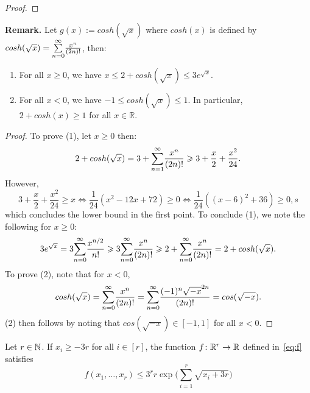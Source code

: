 \begin{proof}
\end{proof}
\textbf{Remark.} Let $g(x):= cosh(\sqrt{x})$ where $cosh(x)$ is defined by $cosh(\sqrt{x})=\overunderset{\infty}{n=0}{\sum}\frac{x^n}{(2n)!}$, then: 
\begin{enumerate}
\item For all $x\geq 0$, we have $x \leq 2+cosh(\sqrt{x}) \leq 3e^{\sqrt{x}}$.
\item For all $x <0$, we have $-1 \leq cosh(\sqrt{x})\leq 1$. In particular, $2+cosh(x)\geq 1$ for all $x\in \mathbb{R}$.
\end{enumerate}
\begin{proof} To prove (1), let $x\geq 0$ then:
\begin{equation*}
  2+cosh(\sqrt{x}) = 3 + \overunderset{\infty}{n=1}{\sum}\frac{x^n}{(2n)!}\geq 3 + \frac{x}{2}+\frac{x^2}{24}.
\end{equation*}
However, \begin{equation*}
  3+\frac{x}{2}+\frac{x^2}{24}\geq x \iff \frac{1}{24}(x^2-12x+72)\geq 0 \iff \frac{1}{24}((x-6)^2+36)\geq 0,s
\end{equation*}
which concludes the lower bound in the first point. To conclude (1), we note the following for $x\geq0$: 
\begin{equation*}
3e^{\sqrt{x}}= 3\overunderset{\infty}{n=0}{\sum}\frac{x^{n/2}}{n!}\geq 3\overunderset{\infty}{n=0}{\sum}\frac{x^{n}}{(2n)!} \geq 2 + \overunderset{\infty}{n=0}{\sum}\frac{x^{n}}{(2n)!}= 2 + cosh(\sqrt{x}).
\end{equation*}
To prove (2), note that for $x<0$,
\begin{equation*}
cosh(\sqrt{x})= \overunderset{\infty}{n=0}{\sum}\frac{x^n}{(2n)!}= \overunderset{\infty}{n=0}{\sum}\frac{(-1)^n \sqrt{-x}^{2n}}{(2n)!}= cos(\sqrt{-x}).
\end{equation*}
(2) then follows by noting that $cos(\sqrt{-x}) \in [-1,1]$ for all $x<0$. 
\end{proof}
\begin{lemma}
  \label{lem:special-function-e}
  Let $r \in \mathbb{N}$. If $x_i \ge - 3r$ for all $i \in [r]$, the function $f \colon \mathbb{R}^r \rightarrow \mathbb{R}$ defined in~\eqref{eq:f} satisfies 
  $$ f(x_1,\dots,x_r) \le 3^r r \exp\bigg( \displaystyle\sum_{i = 1}^r \sqrt{ x_i + 3r } \bigg)$$
\end{lemma}
